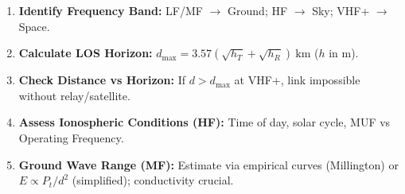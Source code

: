 \documentclass[11pt]{article}
\begin{document}
\begin{methode}
\begin{enumerate}
\item \textbf{Identify Frequency Band:} LF/MF $\to$ Ground; HF $\to$ Sky; VHF+ $\to$ Space.
\item \textbf{Calculate LOS Horizon:} $d_{\max} = 3.57(\sqrt{h_T} + \sqrt{h_R})\ \mathrm{km}$ ($h$ in m).
\item \textbf{Check Distance vs Horizon:} If $d > d_{\max}$ at VHF+, link impossible without relay/satellite.
\item \textbf{Assess Ionospheric Conditions (HF):} Time of day, solar cycle, MUF vs Operating Frequency.
\item \textbf{Ground Wave Range (MF):} Estimate via empirical curves (Millington) or $E \propto P_t / d^2$ (simplified); conductivity crucial.
\end{enumerate}
\end{methode}
\end{document}
